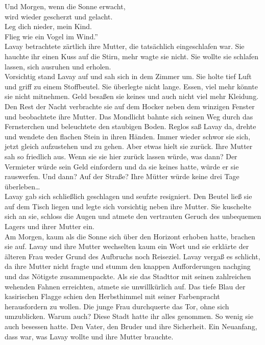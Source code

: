 Und Morgen, wenn die Sonne erwacht,\\
wird wieder gescherzt und gelacht. \\
Leg dich nieder, mein Kind.\\
Flieg wie ein Vogel im Wind.''\\
Lavay betrachtete zärtlich ihre Mutter, die tatsächlich eingeschlafen war. Sie hauchte ihr einen 
Kuss auf die Stirn, mehr wagte sie nicht. Sie wollte sie schlafen lassen, sich ausruhen und 
erholen. \\
Vorsichtig stand Lavay auf und sah sich in dem Zimmer um. Sie holte tief Luft und griff zu einem 
Stoffbeutel. Sie überlegte nicht lange. Essen, viel mehr könnte sie nicht mitnehmen. Geld besaßen 
sie keines und auch nicht viel mehr Kleidung. Den Rest der Nacht verbrachte sie auf dem Hocker neben 
dem winzigen Fenster und beobachtete ihre Mutter. Das Mondlicht bahnte sich seinen Weg durch das 
Fernsterchen und beleuchtete den staubigen Boden. Reglos saß Lavay da, drehte und wendete den 
flachen Stein in ihren Händen. Immer wieder schwor sie sich, jetzt gleich aufzustehen und zu gehen. 
Aber etwas hielt sie zurück. Ihre Mutter sah so friedlich aus. Wenn sie sie hier zurück lassen 
würde, was dann? Der Vermieter würde sein Geld einfordern und da sie keines hatte, würde er sie 
rauswerfen. Und dann? Auf der Straße? Ihre Mütter würde keine drei Tage überleben…\\
Lavay gab sich schließlich geschlagen und seufzte resigniert. Den Beutel ließ sie auf dem Tisch 
liegen und legte sich vorsichtig neben ihre Mutter. Sie kuschelte sich an sie, schloss die Augen und 
atmete den vertrauten Geruch des unbequemen Lagers und ihrer Mutter ein. \\
Am Morgen, kaum als die Sonne sich über den Horizont erhoben hatte, brachen sie auf. Lavay und ihre 
Mutter wechselten kaum ein Wort und sie erklärte der älteren Frau weder Grund des Aufbruchs noch 
Reiseziel. Lavay vergaß es schlicht, da ihre Mutter nicht fragte und stumm den knappen 
Aufforderungen nachging und das Nötigste zusammenpackte. Als sie das Stadttor mit seinen 
zahlreichen wehenden Fahnen erreichten, atmete sie unwillkürlich auf. Das tiefe Blau der 
kasirischen Flagge schien den Herbsthimmel mit seiner Farbenpracht herausfordern zu wollen. Die 
junge Frau durchquerte das Tor, ohne sich umzublicken. Warum auch? Diese Stadt hatte ihr 
alles genommen. So wenig sie auch besessen hatte. Den Vater, den Bruder und ihre Sicherheit. Ein 
Neuanfang, dass war, was Lavay wollte und ihre Mutter brauchte.\\